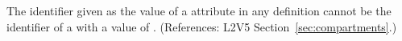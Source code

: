 The identifier given as the value of a 
attribute in any \InitialAssignment definition cannot be the
identifier of a \Compartment with a 
value of .
(References: L2V5 Section~\ref{sec:compartments}.)
